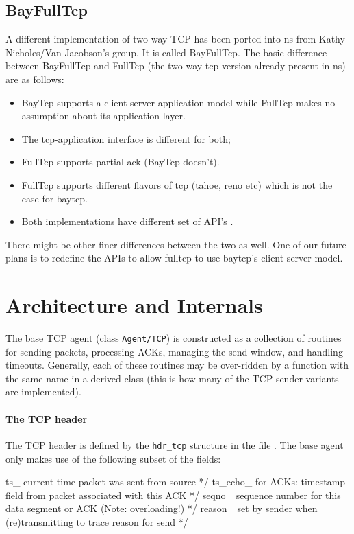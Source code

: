 \subsection{BayFullTcp}
\label{sec:bayfulltcp}

A different implementation of two-way TCP has been ported into ns from Kathy Nicholes/Van Jacobson's group. It is called BayFullTcp. The basic difference between BayFullTcp and FullTcp (the two-way tcp version already present in ns) are as follows:
\begin{itemize}
\item BayTcp supports a client-server application model while FullTcp makes no assumption about its application layer.
\item The tcp-application interface is different for both;
\item FullTcp supports partial ack (BayTcp doesn't).
\item FullTcp supports different flavors of tcp (tahoe, reno etc) which is not the case for baytcp.
\item Both implementations have different set of API's .
\end{itemize}
There might be other finer differences between the two as well.
One of our future plans is to redefine the APIs to allow fulltcp to use
baytcp's client-server model.



\section{Architecture and Internals}
\label{sec:tcparchitecture}

The base TCP agent (class {\tt Agent/TCP}) is constructed
as a collection of routines for sending packets, processing ACKs,
managing the send window, and handling timeouts.
Generally, each of these routines may be over-ridden by a
function with the same name in a derived class (this is how
many of the TCP sender variants are implemented).

\paragraph{The TCP header}
The TCP header is defined by the {\tt hdr\_tcp} structure
in the file .
The base agent only makes use of the following subset of the fields:
\begin{program}
ts_     \* current time packet was sent from source */
ts_echo_ \* for ACKs: timestamp field from packet associated with this ACK */
seqno_ \* sequence number for this data segment or ACK (Note: overloading!) */
reason_ \* set by sender when (re)transmitting to trace reason for send */
\end{program}

